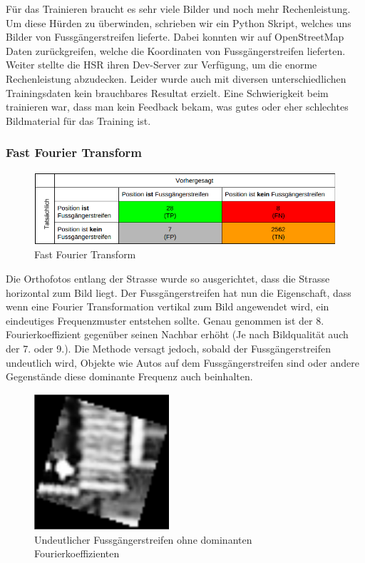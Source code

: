 Für das Trainieren braucht es sehr viele Bilder und noch mehr Rechenleistung. Um diese Hürden zu überwinden, schrieben wir ein Python Skript, welches uns Bilder von Fussgängerstreifen lieferte. Dabei konnten wir auf OpenStreetMap Daten zurückgreifen, welche die Koordinaten von Fussgängerstreifen lieferten. Weiter stellte die HSR ihren Dev-Server zur Verfügung, um die enorme Rechenleistung abzudecken. Leider wurde auch mit diversen unterschiedlichen Trainingsdaten kein brauchbares Resultat erzielt. Eine Schwierigkeit beim trainieren war, dass man kein Feedback bekam, was gutes oder eher schlechtes Bildmaterial für das Training ist.

\subsubsection{Fast Fourier Transform}	
\begin{figure}[H]
\includegraphics[width=\textwidth]{images/fast_fourier_conf.png}
\caption[Fast Fourier Transform]{Fast Fourier Transform}
\end{figure}
Die \Gls{Orthofotos} entlang der Strasse wurde so ausgerichtet, dass die Strasse horizontal zum Bild liegt. Der Fussgängerstreifen hat nun die Eigenschaft, dass wenn eine Fourier Transformation vertikal zum Bild angewendet wird, ein eindeutiges Frequenzmuster entstehen sollte. Genau genommen ist der 8. Fourierkoeffizient gegenüber seinen Nachbar erhöht (Je nach Bildqualität auch der 7. oder 9.).
Die Methode versagt jedoch, sobald der Fussgängerstreifen undeutlich wird, Objekte wie Autos auf dem Fussgängerstreifen sind oder andere Gegenstände diese dominante Frequenz auch beinhalten.\\
\begin{figure}[H]
	\centering
	\includegraphics[width=5cm]{images/Unsharp_Crosswalk2.png}\caption{Undeutlicher Fussgängerstreifen ohne dominanten Fourierkoeffizienten}
\end{figure}
\newpage
